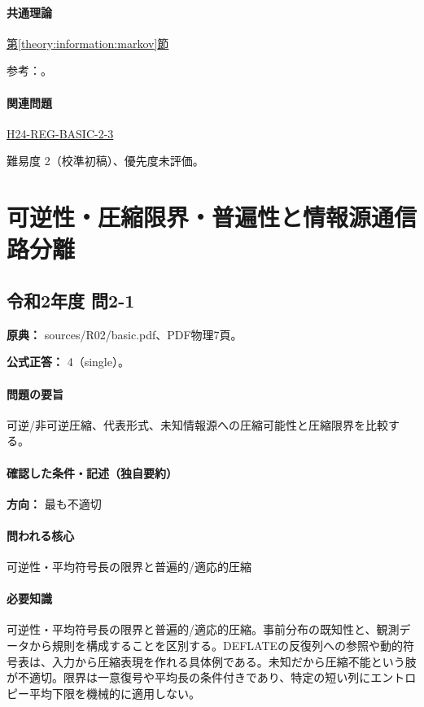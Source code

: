 \paragraph{共通理論} \hyperref[theory:information:markov]{第\ref*{theory:information:markov}節}

\par 参考：\cite{info_markov}。

\paragraph{関連問題} \hyperref[q:h24-reg-basic-2-3]{H24-REG-BASIC-2-3}

\par 難易度 2（校準初稿）、優先度未評価。

\section{可逆性・圧縮限界・普遍性と情報源通信路分離}

\subsection{令和2年度 問2-1}
\label{q:r02-reg-basic-2-1}

\noindent\textbf{原典：} sources/R02/basic.pdf、PDF物理7頁。

\textbf{公式正答：} 4（single）。

\paragraph{問題の要旨} 可逆/非可逆圧縮、代表形式、未知情報源への圧縮可能性と圧縮限界を比較する。

\paragraph{確認した条件・記述（独自要約）}\mbox{}\par

\noindent\textbf{方向：} 最も不適切\par

\paragraph{問われる核心} 可逆性・平均符号長の限界と普遍的/適応的圧縮

\paragraph{必要知識} 可逆性・平均符号長の限界と普遍的/適応的圧縮。事前分布の既知性と、観測データから規則を構成することを区別する。DEFLATEの反復列への参照や動的符号表は、入力から圧縮表現を作れる具体例である。未知だから圧縮不能という肢が不適切。限界は一意復号や平均長の条件付きであり、特定の短い列にエントロピー平均下限を機械的に適用しない。


